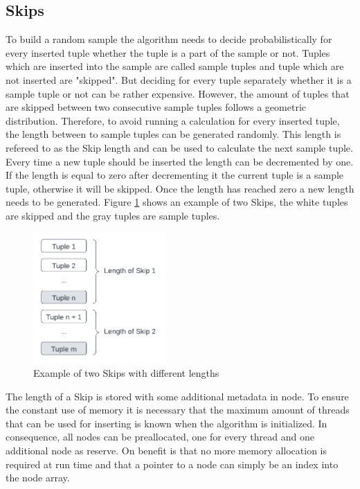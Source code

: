\documentclass[sigconf,nonacm]{acmart}
\begin{document}
    \subsection{Skips}
        To build a random sample the algorithm needs to decide probabilistically for every inserted tuple whether the tuple is a part of the sample or not. Tuples which are inserted into the sample are called sample tuples and tuple which are not inserted are "skipped". But deciding for every tuple separately whether it is a sample tuple or not can be rather expensive. However, the amount of tuples that are skipped between two consecutive sample tuples follows a geometric distribution. Therefore, to avoid running a calculation for every inserted tuple, the length between to sample tuples can be generated randomly. This length is refereed to as the Skip length and can be used to calculate the next sample tuple. Every time a new tuple should be inserted the length can be decremented by one. If the length is equal to zero after decrementing it the current tuple is a sample tuple, otherwise it will be skipped. Once the length has reached zero a new length needs to be generated. Figure \ref{fig:skips} shows an example of two Skips, 
        the white tuples are skipped and the gray tuples are sample tuples.
        \begin{figure}[H]
            \centering
            \includegraphics[height=5cm]{figure1.pdf}
            \caption{Example of two Skips with different lengths}
            \label{fig:skips}
        \end{figure}

        The length of a Skip is stored with some additional metadata in node. To ensure the constant use of memory it is necessary that the maximum amount of threads that can be used for inserting is known when the algorithm is initialized. In consequence, all nodes can be preallocated, one for every thread and one additional node as reserve. On benefit is that no more memory allocation is required at run time and that a pointer to a node can simply be an index into the node array.
\end{document}
